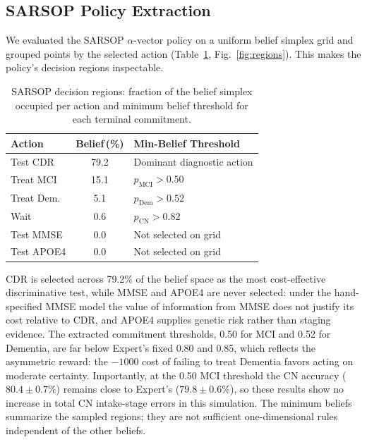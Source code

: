 \documentclass[conference,a4paper]{IEEEtran}
\begin{document}
\subsection{SARSOP Policy Extraction}

We evaluated the SARSOP $\alpha$-vector policy on a uniform belief
simplex grid and grouped points by the selected action
(Table~\ref{tab:regions}, Fig.~\ref{fig:regions}). This makes the
policy's decision regions inspectable.

\begin{table}[!t]
\caption{SARSOP decision regions: fraction of the belief simplex occupied per action and minimum belief threshold for each terminal commitment. }
\label{tab:regions}
\begin{center}
\begin{tabular}{|l|c|l|}
\hline
Action & Belief\,(\%) & Min-Belief Threshold \\
\hline
Test CDR    & 79.2 & Dominant diagnostic action \\
Treat MCI   & 15.1 & $p_\mathrm{MCI} > 0.50$ \\
Treat Dem.  &  5.1 & $p_\mathrm{Dem} > 0.52$ \\
Wait        &  0.6 & $p_\mathrm{CN}  > 0.82$ \\
Test MMSE   &  0.0 & Not selected on grid \\
Test APOE4  &  0.0 & Not selected on grid \\
\hline
\end{tabular}
\end{center}
\end{table}

CDR is selected across 79.2\% of the belief space as the most
cost-effective discriminative test, while MMSE and APOE4 are never
selected: under the hand-specified MMSE model the value of information from
MMSE does not justify its cost relative to CDR, and APOE4 supplies
genetic risk rather than staging evidence. The extracted commitment
thresholds, 0.50 for MCI and 0.52 for Dementia, are far below Expert's
fixed 0.80 and 0.85, which reflects the asymmetric reward: the $-1000$
cost of failing to treat Dementia favors acting on moderate certainty.
Importantly, at the 0.50 MCI threshold the CN accuracy ($80.4{\pm}0.7\%$)
remains close to Expert's ($79.8{\pm}0.6\%$), so these results show no increase in total CN intake-stage errors in this simulation.
The minimum beliefs summarize the sampled regions; they are not
sufficient one-dimensional rules independent of the other beliefs.
\end{document}
